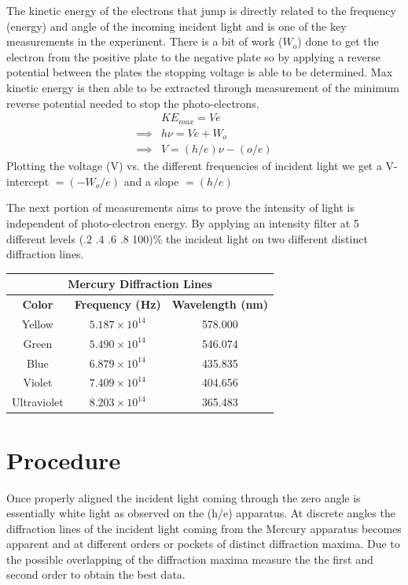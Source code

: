 \documentclass[a4paper, twocolumn]{article}
\begin{document}
The kinetic energy of the electrons that jump is directly related to the frequency (energy) and angle of the incoming incident light and is one of the key measurements in the experiment.
There is a bit of work ($W_o$) done to get the electron from the positive plate to the negative plate so by applying a reverse potential between
the plates the stopping voltage is able to be determined. Max kinetic energy is then able to be extracted through measurement of the minimum
reverse potential needed to stop the photo-electrons.
\begin{align*}
 &KE_{max} = Ve \\
 \implies &h\nu = Ve + W_o \\
 \implies &V = (h/e)\nu - (o/e)
\end{align*}
Plotting the voltage (V) vs. the different frequencies of incident light we get a V-intercept $= (-W_o/e)$ and a slope $= (h/e)$

The next portion of measurements aims to prove the intensity of light is independent of photo-electron energy. By applying an
intensity filter at 5 different levels (.2 .4 .6 .8 100)\%  the incident light on two different distinct diffraction lines.
\begin{table}[h!]
 \centering
 \begin{tabular}{|c|c|c|}
  \hline
  \multicolumn{3}{|c|}{\textbf{Mercury Diffraction Lines}} \\
  \hline
  \textbf{Color} & \textbf{Frequency (Hz)} & \textbf{Wavelength (nm)} \\
  \hline
  Yellow & $5.187\times 10^{14}$ & 578.000 \\
  \hline
  Green & $5.490\times 10^{14}$ & 546.074 \\
  \hline
  Blue & $6.879\times 10^{14}$ & 435.835 \\
  \hline
  Violet & $7.409\times 10^{14}$ & 404.656 \\
  \hline
  Ultraviolet & $8.203\times 10^{14}$ & 365.483 \\
  \hline
 \end{tabular}
\end{table}

\section{Procedure}
Once properly aligned the incident light coming through the zero angle is essentially white light as observed on the (h/e) apparatus.
At discrete angles the diffraction lines of the incident light coming from the Mercury apparatus becomes apparent and at different
orders or pockets of distinct diffraction maxima. Due to the possible overlapping of the diffraction maxima measure the the first
and second order to obtain the best data.
\end{document}
